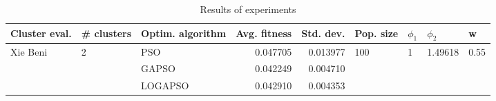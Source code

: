 \begin{table}
\centering
\caption{Results of experiments}
\begin{tabular}{lllrrllll}
\toprule
            Cluster eval. &        \# clusters & Optim. algorithm &  Avg. fitness &  Std. dev. &            Pop. size &         $\phi_{1}$ &               $\phi_{2}$ &                     w \\
\midrule
\multirow{3}{*}{Xie Beni} & \multirow{3}{*}{2} &              PSO &      0.047705 &   0.013977 & \multirow{3}{*}{100} & \multirow{3}{*}{1} & \multirow{3}{*}{1.49618} & \multirow{3}{*}{0.55} \\
                          &                    &            GAPSO &      0.042249 &   0.004710 &                      &                    &                          &                       \\
                          &                    &          LOGAPSO &      0.042910 &   0.004353 &                      &                    &                          &                       \\
\bottomrule
\end{tabular}
\end{table}
